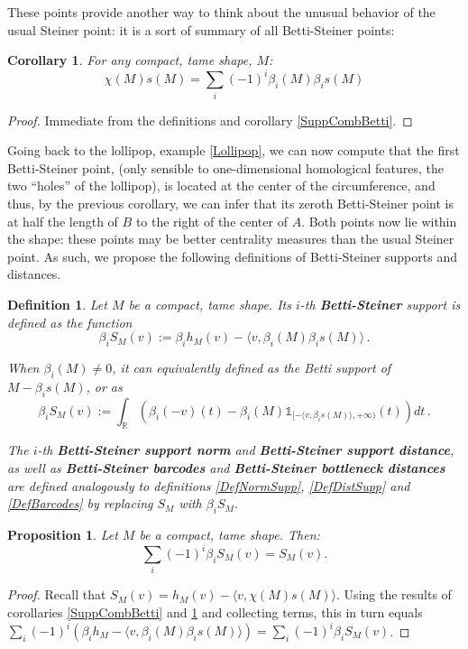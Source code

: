 \documentclass[a4paper]{article}
\newtheorem{prop}[theorem]{Proposition}
\newtheorem{coro}[theorem]{Corollary}
\newtheorem{definition}[theorem]{Definition}
\newcommand{\bb}{\mathbb}
\newcommand{\la}{\langle}
\newcommand{\ra}{\rangle}
\begin{document}
These points provide another way to think about the unusual behavior of the usual Steiner point: it is a sort of summary of all Betti-Steiner points:

\begin{coro}
	\label{StPointCombBetti}
	For any compact, tame shape, $M$:
	\[ \chi(M)s(M)=\sum_{i} (-1)^i \beta_i(M) \beta_is(M) \]
\end{coro}

\begin{proof}
	Immediate from the definitions and corollary \ref{SuppCombBetti}.
\end{proof}

Going back to the lollipop, example \ref{Lollipop}, we can now compute that the first Betti-Steiner point, (only sensible to one-dimensional homological features, the two ``holes'' of the lollipop), is located at the center of the circumference, and thus, by the previous corollary, we can infer that its zeroth Betti-Steiner point is at half the length of $B$ to the right of the center of $A$. Both points now lie within the shape: these points may be better centrality measures than the usual Steiner point. As such, we propose the following definitions of Betti-Steiner supports and distances.

\begin{definition}
	Let $M$ be a compact, tame shape. Its $i$-th \textbf{Betti-Steiner} support is defined as the function
	\[ \beta_iS_M(v) := \beta_ih_M(v)-\la v, \beta_i(M)\beta_is(M) \ra\, . \]
	
	When $\beta_i(M) \neq 0$, it can equivalently defined as the Betti support of $M-\beta_is(M)$, or as
	\[ \beta_iS_M(v):= \int_{\bb R} (\beta_i(-v)(t)-\beta_i(M)\bb 1_{[-\langle v,\beta_is(M) \rangle, +\infty)}(t)) dt\, .\]
	
	The $i$-th \textbf{Betti-Steiner support norm} and \textbf{Betti-Steiner support distance}, as well as \textbf{Betti-Steiner barcodes} and \textbf{Betti-Steiner bottleneck distances} are defined analogously to definitions \ref{DefNormSupp}, \ref{DefDistSupp} and \ref{DefBarcodes} by replacing $S_M$ with $\beta_iS_M$.
\end{definition}

\begin{prop}
	\label{SumBettiSteiner}
	Let $M$ be a compact, tame shape. Then:
	\[ \sum_i (-1)^i \beta_iS_M(v) = S_M(v).\]
\end{prop}

\begin{proof}
	Recall that $S_M(v)=h_M(v)-\la v, \chi(M)s(M) \ra$. Using the results of corollaries \ref{SuppCombBetti} and \ref{StPointCombBetti} and collecting terms, this in turn equals $\sum_i  (-1)^i(\beta_ih_M -\la v, \beta_i(M)\beta_is(M)\ra) = \sum_i (-1)^i \beta_iS_M(v)$.
\end{proof}
\end{document}
